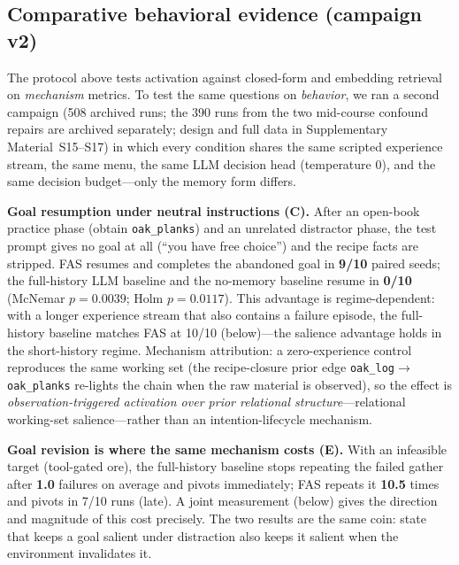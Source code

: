 \documentclass[10pt]{article}
\begin{document}
\subsection{Comparative behavioral evidence (campaign v2)}
\label{sec:res-campaign}

The protocol above tests activation against closed-form and embedding
retrieval on \emph{mechanism} metrics. To test the same questions on
\emph{behavior}, we ran a second campaign (508 archived runs; the 390
runs from the two mid-course confound repairs are archived
separately; design and full data in Supplementary
Material~S15--S17) in which every condition shares the same scripted
experience stream, the same menu, the same LLM decision head
(temperature 0), and the same decision budget---only the memory form
differs.

\textbf{Goal resumption under neutral instructions (C).} After an
open-book practice phase (obtain \texttt{oak\_planks}) and an unrelated
distractor phase, the test prompt gives no goal at all
(``you have free choice'') and the recipe facts are stripped. FAS
resumes and completes the abandoned goal in \textbf{9/10} paired seeds;
the full-history LLM baseline and the no-memory baseline resume in
\textbf{0/10} (McNemar $p{=}0.0039$; Holm $p{=}0.0117$). This advantage
is regime-dependent: with a longer experience stream that also contains
a failure episode, the full-history baseline matches FAS at 10/10
(below)---the salience advantage holds in the short-history regime.
Mechanism attribution: a zero-experience control reproduces the
same working set (the recipe-closure prior edge
\texttt{oak\_log}$\rightarrow$\texttt{oak\_planks} re-lights the chain
when the raw material is observed), so the effect is
\emph{observation-triggered activation over prior relational
structure}---relational working-set salience---rather than an
intention-lifecycle mechanism.

\textbf{Goal revision is where the same mechanism costs (E).} With an
infeasible target (tool-gated ore), the full-history baseline stops
repeating the failed gather after \textbf{1.0} failures on average and
pivots immediately; FAS repeats it \textbf{10.5} times and pivots in
7/10 runs (late). A joint measurement (below) gives the direction and
magnitude of this cost precisely. The two results are the same coin: state that keeps
a goal salient under distraction also keeps it salient when the
environment invalidates it.
\end{document}
